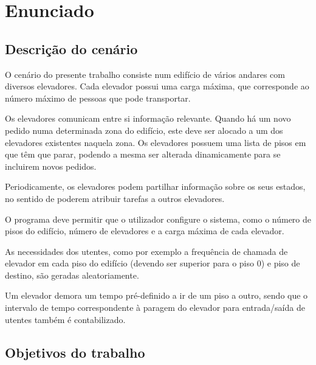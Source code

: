 \documentclass[a4paper]{article}
\begin{document}
\newpage

\tableofcontents



\newpage

\section{Enunciado}

\subsection{Descrição do cenário} 

O cenário do presente trabalho consiste num edifício de vários andares com diversos elevadores. Cada elevador possui uma carga máxima, que corresponde ao número máximo de pessoas que pode transportar.

Os elevadores comunicam entre si informação relevante. Quando há um novo pedido numa determinada zona do edifício, este deve ser alocado a um dos elevadores existentes naquela zona. Os elevadores possuem uma lista de pisos em que têm que parar, podendo a mesma ser alterada dinamicamente para se incluirem novos pedidos.

Periodicamente, os elevadores podem partilhar informação sobre os seus estados, no sentido de poderem atribuir tarefas a outros elevadores.

O programa deve permitir que o utilizador configure o sistema, como o número de pisos do edifício, número de elevadores e a carga máxima de cada elevador.

As necessidades dos utentes, como por exemplo a frequência de chamada de elevador em cada piso do edifício (devendo ser superior para o piso 0) e piso de destino, são geradas aleatoriamente. 

Um elevador demora um tempo pré-definido a ir de um piso a outro, sendo que o intervalo de tempo correspondente à paragem do elevador para entrada/saída de utentes também é contabilizado.

\subsection{Objetivos do trabalho} 
\end{document}
